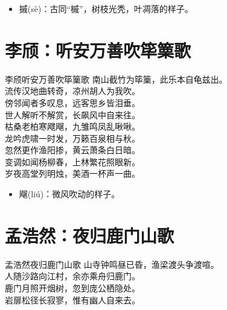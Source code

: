 \documentclass[12pt,oneside,a5paper]{book}
\begin{document}
\begin{itemize}
\item 摵(sè)：古同“槭”，树枝光秃，叶凋落的样子。
\end{itemize}

\chapter{李颀：听安万善吹筚篥歌}
\begin{poemzh}{李颀}{听安万善吹筚篥歌}
南山截竹为筚篥，此乐本自龟兹出。\\
流传汉地曲转奇，凉州胡人为我吹。\\
傍邻闻者多叹息，远客思乡皆泪垂。\\
世人解听不解赏，长飙风中自来往。\\
枯桑老柏寒飕飗，九雏鸣凤乱啾啾。\\
龙吟虎啸一时发，万籁百泉相与秋。\\
忽然更作渔阳掺，黄云萧条白日暗。\\
变调如闻杨柳春，上林繁花照眼新。\\
岁夜高堂列明烛，美酒一杯声一曲。\\ 
\end{poemzh}

\begin{itemize}
\item 飗(liú)：微风吹动的样子。
\end{itemize}

\chapter{孟浩然：夜归鹿门山歌}
\begin{poemzh}{孟浩然}{夜归鹿门山歌}
山寺钟鸣昼已昏，渔梁渡头争渡喧。\\
人随沙路向江村，余亦乘舟归鹿门。\\
鹿门月照开烟树，忽到庞公栖隐处。\\
岩扉松径长寂寥，惟有幽人自来去。\\ 
\end{poemzh}
\end{document}
